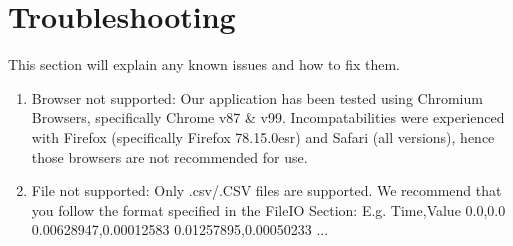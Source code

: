\section{Troubleshooting}
This section will explain any known issues and how to fix them.

\begin{enumerate}
\item Browser not supported: Our application has been tested using Chromium Browsers, specifically Chrome v87 & v99. Incompatabilities were experienced with Firefox (specifically Firefox 78.15.0esr) and Safari (all versions), hence those browsers are not recommended for use. 
\item File not supported: Only .csv/.CSV files are supported. We recommend that you follow the format specified in the FileIO Section: E.g.  
Time,Value
0.0,0.0
0.00628947,0.00012583
0.01257895,0.00050233
... 
\end{enumerate}
